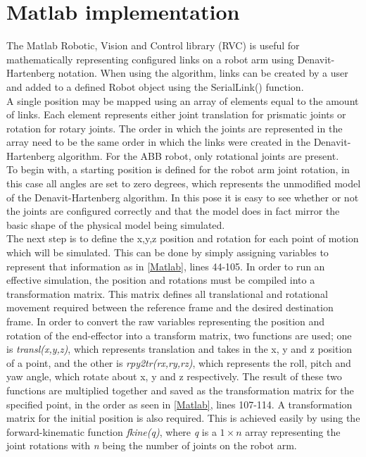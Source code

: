 \documentclass[11pt,a4paper, margin=1in]{report}
\newcommand{\note}[1]{\marginpar{\tiny{ \hl{#1 } } }  }
\begin{document}
\section{Matlab implementation}
The Matlab Robotic, Vision and Control library (RVC) is useful for mathematically representing configured links on a robot arm using Denavit-Hartenberg notation. When using the algorithm, links can be created by a user and added to a defined Robot object using the SerialLink() function.\\
A single position may be mapped using an array of elements equal to the amount of links. Each element represents either joint translation for prismatic joints or rotation for rotary joints. The order in which the joints are represented in the array need to be the same order in which the links were created in the Denavit-Hartenberg algorithm. For the ABB robot, only rotational joints are present.\\
To begin with, a starting position is defined for the robot arm joint rotation, in this case all angles are set to zero degrees, which represents the unmodified model of the Denavit-Hartenberg algorithm. In this \note{screenshot} pose it is easy to see whether or not the joints are configured correctly and that the model does in fact mirror the basic shape of the physical model being simulated.\\ 
The next step is to define the x,y,z position and rotation for each point of motion which will be simulated. This can be done by simply assigning variables to represent that information as in \cref{Matlab}, lines 44-105. In order to run an effective simulation, the position and rotations must be compiled into a transformation matrix. This matrix defines all translational and rotational movement required between the reference frame and the desired destination frame. In order to convert the raw variables representing the position and rotation of the end-effector into a transform matrix, two functions are used; one is \textit{transl(x,y,z)}, which represents translation and takes in the x, y and z position of a point, and the other is \textit{rpy2tr(rx,ry,rz)}, which represents the roll, pitch and yaw angle, which rotate about x, y and z respectively. The result of these two functions are multiplied together and saved as the transformation matrix for the specified point, in the order as seen in \cref{Matlab}, lines 107-114. A transformation matrix for the initial position is also required. This is achieved easily by using the forward-kinematic function \textit{fkine(q)}, where \textit{q} is a $1 \times n$  array representing the joint rotations with \textit{n} being the number of joints on the robot arm.\\
\end{document}
